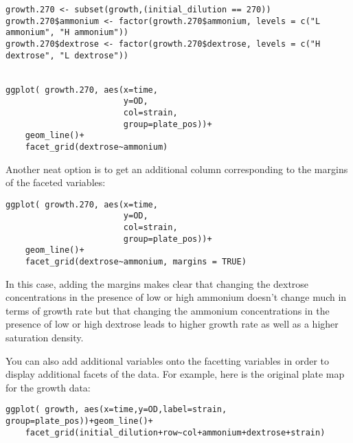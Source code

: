\documentclass[11pt]{article}
\begin{document}
\begin{verbatim}
growth.270 <- subset(growth,(initial_dilution == 270))
growth.270$ammonium <- factor(growth.270$ammonium, levels = c("L ammonium", "H ammonium"))
growth.270$dextrose <- factor(growth.270$dextrose, levels = c("H dextrose", "L dextrose"))


ggplot( growth.270, aes(x=time,
                        y=OD,
                        col=strain,
                        group=plate_pos))+
    geom_line()+
    facet_grid(dextrose~ammonium)
\end{verbatim}


Another neat option is to get an additional column corresponding to
the margins of the faceted variables:

\begin{verbatim}
ggplot( growth.270, aes(x=time,
                        y=OD,
                        col=strain,
                        group=plate_pos))+
    geom_line()+
    facet_grid(dextrose~ammonium, margins = TRUE)
\end{verbatim}


In this case, adding the margins makes clear that changing the
dextrose concentrations in the presence of low or high ammonium doesn't change
much in terms of growth rate but that changing the ammonium
concentrations in the presence of low or high dextrose leads to higher
growth rate as well as a higher saturation density.

You can also add additional variables onto the facetting variables in
order to display additional facets of the data. For example, here is
the original plate map for the growth data:


\begin{verbatim}
ggplot( growth, aes(x=time,y=OD,label=strain, group=plate_pos))+geom_line()+
    facet_grid(initial_dilution+row~col+ammonium+dextrose+strain)
\end{verbatim}
\end{document}

